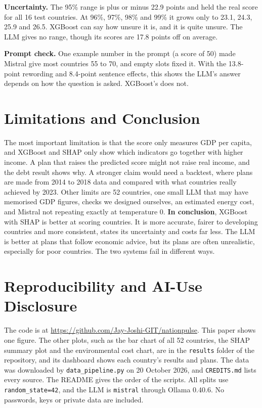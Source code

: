 \documentclass{article}
\begin{document}
\textbf{Uncertainty.} The 95\% range is plus or minus 22.9 points and held the real score for all 16 test countries. At 96\%, 97\%, 98\% and 99\% it grows only to 23.1, 24.3, 25.9 and 26.5. XGBoost can say how unsure it is, and it is quite unsure. The LLM gives no range, though its scores are 17.8 points off on average.

\textbf{Prompt check.} One example number in the prompt (a score of 50) made Mistral give most countries 55 to 70, and empty slots fixed it. With the 13.8-point rewording and 8.4-point sentence effects, this shows the LLM's answer depends on how the question is asked. XGBoost's does not.

\section{Limitations and Conclusion}
The most important limitation is that the score only measures GDP per capita, and XGBoost and SHAP only show which indicators go together with higher income. A plan that raises the predicted score might not raise real income, and the debt result shows why. A stronger claim would need a backtest, where plans are made from 2014 to 2018 data and compared with what countries really achieved by 2023. Other limits are 52 countries, one small LLM that may have memorised GDP figures, checks we designed ourselves, an estimated energy cost, and Mistral not repeating exactly at temperature 0. \textbf{In conclusion}, XGBoost with SHAP is better at scoring countries. It is more accurate, fairer to developing countries and more consistent, states its uncertainty and costs far less. The LLM is better at plans that follow economic advice, but its plans are often unrealistic, especially for poor countries. The two systems fail in different ways.

\section{Reproducibility and AI-Use Disclosure}
The code is at \url{https://github.com/Jay-Joshi-GIT/nationpulse}. This paper shows one figure. The other plots, such as the bar chart of all 52 countries, the SHAP summary plot and the environmental cost chart, are in the \texttt{results} folder of the repository, and its dashboard shows each country's results and plans. The data was downloaded by \texttt{data\_pipeline.py} on 20 October 2026, and \texttt{CREDITS.md} lists every source. The README gives the order of the scripts. All splits use \texttt{random\_state=42}, and the LLM is \texttt{mistral} through Ollama 0.40.6. No passwords, keys or private data are included.
\end{document}
